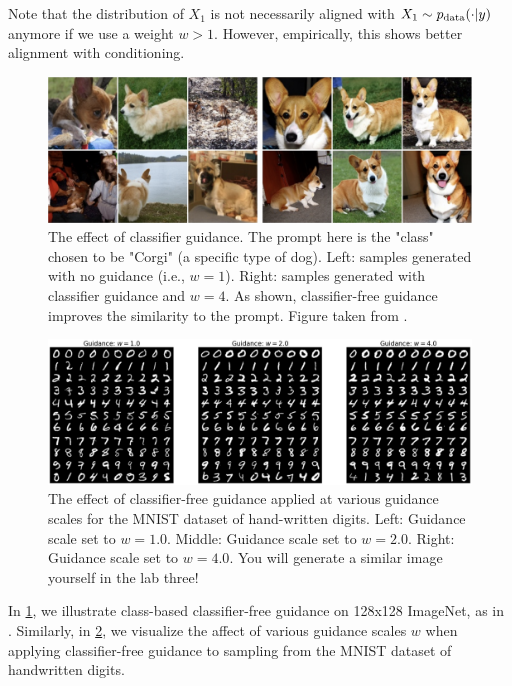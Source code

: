 Note that the distribution of $X_1$ is not necessarily aligned with $X_1 \sim  p_{\rm{data}}(\cdot | y)$ anymore if we use a weight $w>1$. However, empirically, this shows better alignment with conditioning.
\begin{figure}[!t]
    \centering
    \includegraphics[width=\linewidth]{figures/salimans_cfg.png}
    \caption{The effect of classifier guidance. The prompt here is the "class" chosen to be "Corgi" (a specific type of dog). Left: samples generated with no guidance (i.e., $w = 1$). Right: samples generated with classifier guidance and $w = 4$. As shown, classifier-free guidance improves the similarity to the prompt. Figure taken from \cite{cfg}.}
    \label{fig:guidance}
\end{figure}
\begin{figure}[!t]
    \centering
    \includegraphics[width=\linewidth]{figures/guidance.png}
    \caption{The effect of classifier-free guidance applied at various guidance scales for the MNIST dataset of hand-written digits. Left: Guidance scale set to $w = 1.0$. Middle: Guidance scale set to $w = 2.0$. Right: Guidance scale set to $w = 4.0$. You will generate a similar image yourself in the lab three!}
    \label{fig:mnist_guidance}
\end{figure}
In \cref{fig:guidance}, we illustrate class-based classifier-free guidance on 128x128 ImageNet, as in \cite{cfg}. Similarly, in \cref{fig:mnist_guidance}, we visualize the affect of various guidance scales $w$ when applying classifier-free guidance to sampling from the MNIST dataset of handwritten digits.

